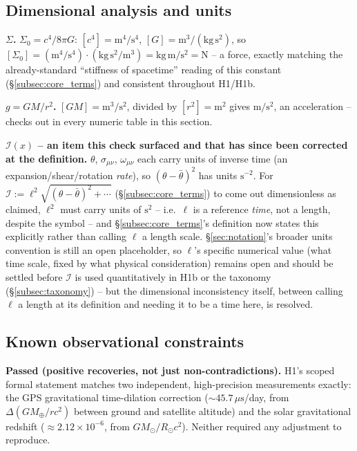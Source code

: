 \documentclass[12pt, a4paper]{article}
\begin{document}
\subsection{Dimensional analysis and units}
\textbf{$\Sigma$.} $\Sigma_0 = c^4/8\pi G$: $[c^4]=\mathrm{m^4/s^4}$,
$[G]=\mathrm{m^3/(kg\,s^2)}$, so $[\Sigma_0] =
\mathrm{(m^4/s^4)\cdot(kg\,s^2/m^3)} = \mathrm{kg\,m/s^2} =
\mathrm{N}$ -- a force, exactly matching the already-standard
``stiffness of spacetime'' reading of this constant
(\S\ref{subsec:core_terms}) and consistent throughout H1/H1b.

\textbf{$g=GM/r^2$.} $[GM]=\mathrm{m^3/s^2}$, divided by
$[r^2]=\mathrm{m^2}$ gives $\mathrm{m/s^2}$, an acceleration -- checks
out in every numeric table in this section.

\textbf{$\mathcal{I}(x)$ -- an item this check surfaced and that has
since been corrected at the definition.} $\theta$, $\sigma_{\mu\nu}$,
$\omega_{\mu\nu}$ each carry units of inverse time (an
expansion/shear/rotation \emph{rate}), so $(\theta-\bar\theta)^2$ has
units $\mathrm{s^{-2}}$. For $\mathcal{I}:=\ell^2\sqrt{(\theta-
\bar\theta)^2+\cdots}$ (\S\ref{subsec:core_terms}) to come out
dimensionless as claimed, $\ell^2$ must carry units of
$\mathrm{s^2}$ -- i.e.\ $\ell$ is a reference \emph{time}, not a
length, despite the symbol -- and \S\ref{subsec:core_terms}'s
definition now states this explicitly rather than calling $\ell$ a
length scale. \S\ref{sec:notation}'s broader units convention is
still an open placeholder, so $\ell$'s specific numerical value (what
time scale, fixed by what physical consideration) remains open and
should be settled before $\mathcal{I}$ is used quantitatively in H1b
or the taxonomy (\S\ref{subsec:taxonomy}) -- but the dimensional
inconsistency itself, between calling $\ell$ a length at its
definition and needing it to be a time here, is resolved.

\subsection{Known observational constraints}
\textbf{Passed (positive recoveries, not just non-contradictions).}
H1's scoped formal statement matches two independent, high-precision
measurements exactly: the GPS gravitational time-dilation correction
($\sim45.7\,\mu\mathrm{s}$/day, from $\Delta(GM_\oplus/rc^2)$ between
ground and satellite altitude) and the solar gravitational redshift
($\approx2.12\times10^{-6}$, from $GM_\odot/R_\odot c^2$). Neither
required any adjustment to reproduce.
\end{document}
